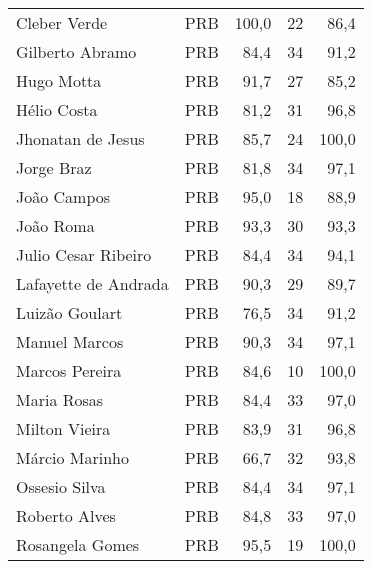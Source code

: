 \begin{longtable}{llrrr}
                        Cleber Verde &            PRB &     100,0 &           22 &       86,4 \\
                     Gilberto Abramo &            PRB &      84,4 &           34 &       91,2 \\
                          Hugo Motta &            PRB &      91,7 &           27 &       85,2 \\
                         Hélio Costa &            PRB &      81,2 &           31 &       96,8 \\
                   Jhonatan de Jesus &            PRB &      85,7 &           24 &      100,0 \\
                          Jorge Braz &            PRB &      81,8 &           34 &       97,1 \\
                         João Campos &            PRB &      95,0 &           18 &       88,9 \\
                           João Roma &            PRB &      93,3 &           30 &       93,3 \\
                 Julio Cesar Ribeiro &            PRB &      84,4 &           34 &       94,1 \\
                Lafayette de Andrada &            PRB &      90,3 &           29 &       89,7 \\
                      Luizão Goulart &            PRB &      76,5 &           34 &       91,2 \\
                       Manuel Marcos &            PRB &      90,3 &           34 &       97,1 \\
                      Marcos Pereira &            PRB &      84,6 &           10 &      100,0 \\
                         Maria Rosas &            PRB &      84,4 &           33 &       97,0 \\
                       Milton Vieira &            PRB &      83,9 &           31 &       96,8 \\
                      Márcio Marinho &            PRB &      66,7 &           32 &       93,8 \\
                       Ossesio Silva &            PRB &      84,4 &           34 &       97,1 \\
                       Roberto Alves &            PRB &      84,8 &           33 &       97,0 \\
                     Rosangela Gomes &            PRB &      95,5 &           19 &      100,0 \\

\end{longtable}

